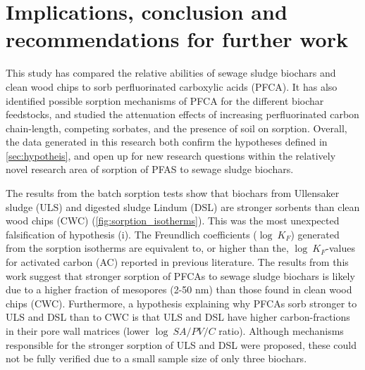\chapter{Implications, conclusion and recommendations for further work}\label{chap:Conclusion}
This study has compared the relative abilities of sewage sludge biochars and clean wood chips to sorb perfluorinated carboxylic acids (PFCA). It has also identified possible sorption mechanisms of PFCA for the different biochar feedstocks, and studied the attenuation effects of increasing perfluorinated carbon chain-length, competing sorbates, and the presence of soil on sorption. Overall, the data generated in this research both confirm the hypotheses defined in \cref{sec:hypotheis}, and open up for new research questions within the relatively novel research area of sorption of PFAS to sewage sludge biochars.

The results from the batch sorption tests show that biochars from Ullensaker sludge (ULS) and digested sludge Lindum (DSL) are stronger sorbents than clean wood chips (CWC) (\cref{fig:sorption_isotherms}). This was the most unexpected falsification of hypothesis (i). The Freundlich coefficients ($\log~K_F$) generated from the sorption isotherms are equivalent to, or higher than the, $\log~K_F$-values for activated carbon (AC) reported in previous literature. The results from this work suggest that stronger sorption of PFCAs to sewage sludge biochars is likely due to a higher fraction of mesopores (2-50 nm) than those found in clean wood chips (CWC). Furthermore, a hypothesis explaining why PFCAs sorb stronger to ULS and DSL than to CWC is that ULS and DSL have higher carbon-fractions in their pore wall matrices (lower $\log~SA/PV/C$ ratio). Although mechanisms responsible for the stronger sorption of ULS and DSL were proposed, these could not be fully verified due to a small sample size of only three biochars. 

